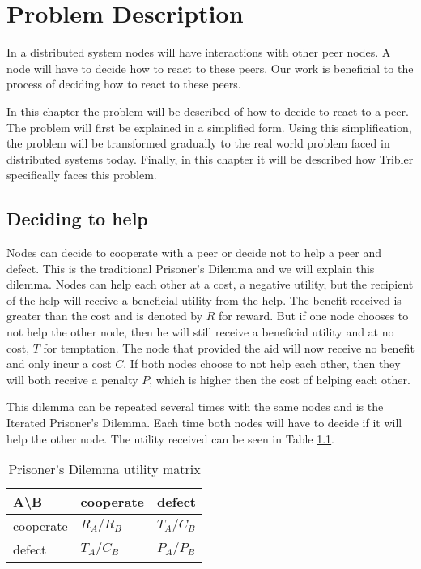 \chapter{Problem Description}
In a distributed system nodes will have interactions with other peer nodes.
A node will have to decide how to react to these peers.
Our work is beneficial to the process of deciding how to react to these peers.

In this chapter the problem will be described of how to decide to react to a peer.
The problem will first be explained in a simplified form.
Using this simplification, the problem will be transformed gradually
to the real world problem faced in distributed systems today.
Finally, in this chapter it will be described how Tribler specifically faces this problem. 

\section{Deciding to help}
Nodes can decide to cooperate with a peer or decide not to help a peer and defect.
This is the traditional Prisoner's Dilemma 
and we will explain this dilemma\cite{Nowak-PrisonerDilemma}\cite{Lai-Incentives}.
Nodes can help each other at a cost, a negative utility, 
but the recipient of the help will receive a beneficial utility from the help.
The benefit received is greater than the cost and is denoted by $R$ for reward.
But if one node chooses to not help the other node,
 then he will still receive a beneficial utility and at no cost, $T$ for temptation.
The node that provided the aid will now receive no benefit and only incur a cost $C$.
If both nodes choose to not help each other, 
then they will both receive a penalty $P$, which is higher then the cost of helping each other.

This dilemma can be repeated several times with the same nodes and is the Iterated Prisoner's Dilemma.
Each time both nodes will have to decide if it will help the other node.
The utility received can be seen in Table \ref{tab:pd-um}.

\begin{table}[h]
\center
	\begin{tabular}{l|ll}
	A\textbackslash B       & cooperate  & defect     \\ \hline
	cooperate & $R_A /R_B$ & $T_A /C_B$ \\
	defect    & $T_A /C_B$ & $P_A /P_B$
	\end{tabular}
\caption{Prisoner's Dilemma utility matrix}
\label{tab:pd-um}
\end{table}

